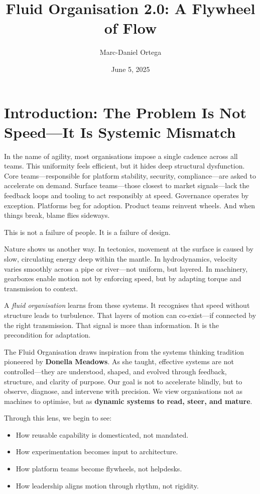 \documentclass[12pt]{article}
\title{Fluid Organisation 2.0: A Flywheel of Flow}
\author{Marc-Daniel Ortega}
\date{June 5, 2025}
\begin{document}
\maketitle
\tableofcontents
\newpage

\section{Introduction: The Problem Is Not Speed—It Is Systemic Mismatch}

In the name of agility, most organisations impose a single cadence across all teams. This uniformity feels efficient, but it hides deep structural dysfunction. Core teams---responsible for platform stability, security, compliance---are asked to accelerate on demand. Surface teams---those closest to market signals---lack the feedback loops and tooling to act responsibly at speed. Governance operates by exception. Platforms beg for adoption. Product teams reinvent wheels. And when things break, blame flies sideways.

This is not a failure of people. It is a failure of design.

Nature shows us another way. In tectonics, movement at the surface is caused by slow, circulating energy deep within the mantle. In hydrodynamics, velocity varies smoothly across a pipe or river---not uniform, but layered. In machinery, gearboxes enable motion not by enforcing speed, but by adapting torque and transmission to context.

A \textit{fluid organisation} learns from these systems. It recognises that speed without structure leads to turbulence. That layers of motion can co-exist---if connected by the right transmission. That signal is more than information. It is the precondition for adaptation.

The Fluid Organisation draws inspiration from the systems thinking tradition pioneered by \textbf{Donella Meadows}. As she taught, effective systems are not controlled---they are understood, shaped, and evolved through feedback, structure, and clarity of purpose. Our goal is not to accelerate blindly, but to observe, diagnose, and intervene with precision. We view organisations not as machines to optimise, but as \textbf{dynamic systems to read, steer, and mature}.

Through this lens, we begin to see:
\begin{itemize}
    \item How reusable capability is domesticated, not mandated.
    \item How experimentation becomes input to architecture.
    \item How platform teams become flywheels, not helpdesks.
    \item How leadership aligns motion through rhythm, not rigidity.
\end{itemize}
\end{document}
